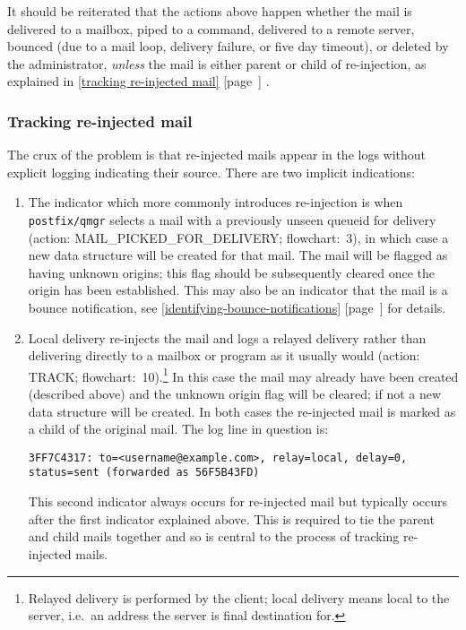 \documentclass[a4paper,12pt,draft]{article}
\newcommand{\refwithpage}[1]{%
    \empty{}\ref{#1} [page~\pageref{#1}]%
}
\newcommand{\sectionref}[1]{%
    \textsection{}\refwithpage{#1}%
}
\newcommand{\daemon}[1]{%
    \texttt{postfix/#1}%
}
\begin{document}
It should be reiterated that the actions above happen whether the mail is
delivered to a mailbox, piped to a command, delivered to a remote server,
bounced (due to a mail loop, delivery failure, or five day timeout), or
deleted by the administrator, \textit{unless\/} the mail is either parent
or child of re-injection, as explained in \sectionref{tracking re-injected
mail}.

\subsubsection{Tracking re-injected mail}

\label{tracking re-injected mail}

The crux of the problem is that re-injected mails appear in the logs
without explicit logging indicating their source.  There are two implicit
indications:

\begin{enumerate}

    \item The indicator which more commonly introduces re-injection is when
        \daemon{qmgr} selects a mail with a previously unseen queueid for
        delivery (action: MAIL\_PICKED\_FOR\_DELIVERY\@; flowchart:~3), in
        which case a new data structure will be created for that mail.  The
        mail will be flagged as having unknown origins; this flag should be
        subsequently cleared once the origin has been established.  This
        may also be an indicator that the mail is a bounce notification,
        see \sectionref{identifying-bounce-notifications} for details.

    \item Local delivery re-injects the mail and logs a relayed delivery
        rather than delivering directly to a mailbox or program as it
        usually would (action: TRACK\@; flowchart:~10).\footnote{Relayed
        delivery is performed by the \SMTP{} client; local delivery means
        local to the server, i.e.\ an address the server is final
        destination for.} In this case the mail may already have been
        created (described above) and the unknown origin flag will be
        cleared; if not a new data structure will be created.  In both
        cases the re-injected mail is marked as a child of the original
        mail.  The log line in question is:

        \texttt{3FF7C4317: to=<username@example.com>, relay=local, \newline
        delay=0, status=sent (forwarded as 56F5B43FD)}

        This second indicator always occurs for re-injected mail but
        typically occurs after the first indicator explained above.  This
        is required to tie the parent and child mails together and so is
        central to the process of tracking re-injected mails.

\end{enumerate}
\end{document}
